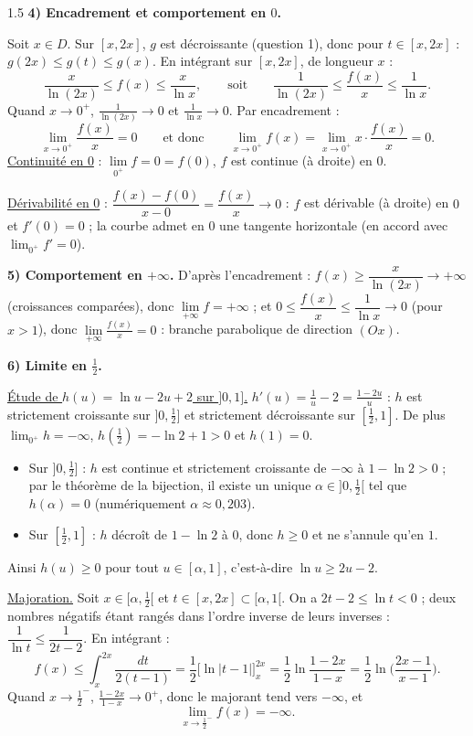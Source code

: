 \documentclass[12pt]{article}
\begin{document}
\begin{spacing}{1.5}
\textbf{4) Encadrement et comportement en $0$.}

Soit $x\in D$. Sur $[x,2x]$, $g$ est décroissante (question 1), donc pour $t\in[x,2x]$ : $g(2x)\le g(t)\le g(x)$. En intégrant sur $[x,2x]$, de longueur $x$ :
\[
\boxed{\frac{x}{\ln(2x)}\le f(x)\le\frac{x}{\ln x}},\qquad\text{soit}\qquad\frac1{\ln(2x)}\le\frac{f(x)}x\le\frac1{\ln x}.
\]
Quand $x\to0^+$, $\frac1{\ln(2x)}\to0$ et $\frac1{\ln x}\to0$. Par encadrement :
\[
\lim_{x\to0^+}\frac{f(x)}{x}=0\qquad\text{et donc}\qquad\lim_{x\to0^+}f(x)=\lim_{x\to0^+}x\cdot\frac{f(x)}{x}=0 .
\]
\underline{Continuité en 0} : $\lim\limits_{0^+}f=0=f(0)$, $f$ est continue (à droite) en $0$.

\underline{Dérivabilité en 0} : $\dfrac{f(x)-f(0)}{x-0}=\dfrac{f(x)}{x}\to0$ : $f$ est dérivable (à droite) en $0$ et $f'(0)=0$ ; la courbe admet en $0$ une tangente horizontale (en accord avec $\lim_{0^+}f'=0$).

\textbf{5) Comportement en $+\infty$.} D'après l'encadrement : $f(x)\ge\dfrac{x}{\ln(2x)}\to+\infty$ (croissances comparées), donc $\boxed{\lim\limits_{+\infty}f=+\infty}$ ; et $0\le\dfrac{f(x)}x\le\dfrac1{\ln x}\to0$ (pour $x>1$), donc $\boxed{\lim\limits_{+\infty}\frac{f(x)}x=0}$ : branche parabolique de direction $(Ox)$.

\textbf{6) Limite en $\frac12$.}

\underline{Étude de $h(u)=\ln u-2u+2$ sur $]0,1]$.} $h'(u)=\frac1u-2=\frac{1-2u}{u}$ : $h$ est strictement croissante sur $]0,\frac12]$ et strictement décroissante sur $[\frac12,1]$. De plus $\lim_{0^+}h=-\infty$, $h(\frac12)=-\ln2+1>0$ et $h(1)=0$.
\begin{itemize}
\item Sur $]0,\frac12]$ : $h$ est continue et strictement croissante de $-\infty$ à $1-\ln2>0$ ; par le théorème de la bijection, il existe un unique $\alpha\in]0,\frac12[$ tel que $h(\alpha)=0$ (numériquement $\alpha\approx0{,}203$).
\item Sur $[\frac12,1]$ : $h$ décroît de $1-\ln2$ à $0$, donc $h\ge0$ et ne s'annule qu'en $1$.
\end{itemize}
Ainsi $h(u)\ge0$ pour tout $u\in[\alpha,1]$, c'est-à-dire $\ln u\ge2u-2$.

\underline{Majoration.} Soit $x\in[\alpha,\frac12[$ et $t\in[x,2x]\subset[\alpha,1[$. On a $2t-2\le\ln t<0$ ; deux nombres négatifs étant rangés dans l'ordre inverse de leurs inverses : $\dfrac1{\ln t}\le\dfrac1{2t-2}$. En intégrant :
\[
f(x)\le\int_x^{2x}\frac{dt}{2(t-1)}=\frac12\Big[\ln|t-1|\Big]_x^{2x}=\frac12\ln\frac{1-2x}{1-x}=\frac12\ln\Big(\frac{2x-1}{x-1}\Big).
\]
Quand $x\to\frac12^-$, $\frac{1-2x}{1-x}\to0^+$, donc le majorant tend vers $-\infty$, et
\[
\boxed{\lim_{x\to\frac12^-}f(x)=-\infty}.
\]


\end{spacing}
\end{document}
